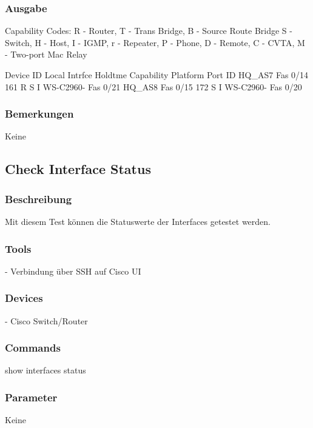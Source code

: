 \documentclass[a4,12pt]{scrartcl}
\begin{document}
\subsubsection{Ausgabe}
Capability Codes: R - Router, T - Trans Bridge, B - Source Route Bridge\newline
                  S - Switch, H - Host, I - IGMP, r - Repeater, P - Phone,\newline
                  D - Remote, C - CVTA, M - Two-port Mac Relay\newline

Device ID        Local Intrfce     Holdtme    Capability  Platform  Port ID\newline
HQ_AS7           Fas 0/14          161             R S I  WS-C2960- Fas 0/21\newline
HQ_AS8           Fas 0/15          172              S I   WS-C2960- Fas 0/20\newline
\subsubsection{Bemerkungen}
Keine









\subsection{Check Interface Status}
\subsubsection{Beschreibung}
Mit diesem Test können die Statuswerte der Interfaces getestet werden.
\subsubsection{Tools}
- Verbindung über SSH auf Cisco UI
\subsubsection{Devices}
- Cisco Switch/Router
\subsubsection{Commands}
show interfaces status
\subsubsection{Parameter}
Keine
\end{document}
